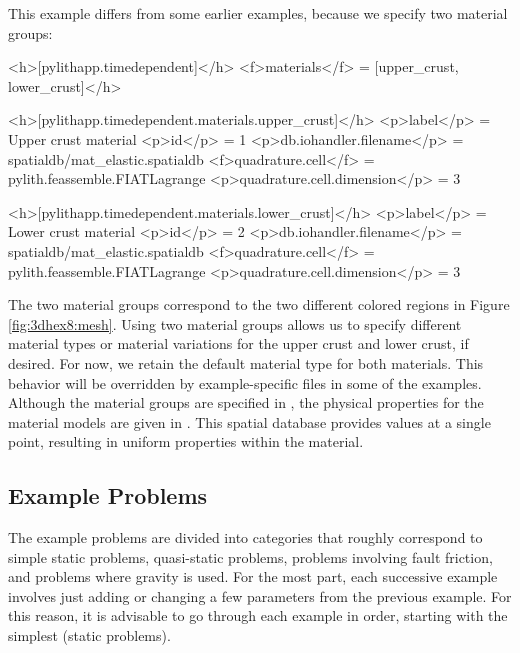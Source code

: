 This example differs from some earlier examples, because we specify
two material groups:
\begin{cfg}
<h>[pylithapp.timedependent]</h>
<f>materials</f> = [upper_crust, lower_crust]</h>

<h>[pylithapp.timedependent.materials.upper_crust]</h>
<p>label</p> = Upper crust material
<p>id</p> = 1
<p>db.iohandler.filename</p> = spatialdb/mat_elastic.spatialdb
<f>quadrature.cell</f> = pylith.feassemble.FIATLagrange
<p>quadrature.cell.dimension</p> = 3

<h>[pylithapp.timedependent.materials.lower_crust]</h>
<p>label</p> = Lower crust material
<p>id</p> = 2
<p>db.iohandler.filename</p> = spatialdb/mat\_elastic.spatialdb
<f>quadrature.cell</f> = pylith.feassemble.FIATLagrange
<p>quadrature.cell.dimension</p> = 3
\end{cfg}
The two material groups correspond to the two different colored regions
in Figure \vref{fig:3dhex8:mesh}. Using two material groups allows
us to specify different material types or material variations for
the upper crust and lower crust, if desired. For now, we retain the
default  material type for both materials.
This behavior will be overridden by example-specific 
files in some of the examples. Although the material groups are specified
in , the physical properties for the material
models are given in  
. This spatial database provides values
at a single point, resulting in uniform properties within the material.


\subsection{Example Problems}

The example problems are divided into categories that roughly correspond
to simple static problems, quasi-static problems, problems involving
fault friction, and problems where gravity is used. For the most part,
each successive example involves just adding or changing a few parameters
from the previous example. For this reason, it is advisable to go
through each example in order, starting with the simplest (static
problems).









